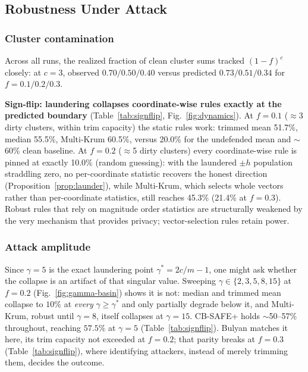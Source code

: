\documentclass[lettersize,journal]{IEEEtran}
\begin{document}


\subsection{Robustness Under Attack}
\subsubsection{Cluster contamination} Across all runs, the realized fraction of
clean cluster sums tracked $(1-f)^c$ closely: at $c{=}3$, observed $0.70/0.50/0.40$
versus predicted $0.73/0.51/0.34$ for $f{=}0.1/0.2/0.3$.

\textbf{Sign-flip: laundering collapses coordinate-wise rules exactly at the
predicted boundary} (Table~\ref{tab:signflip}, Fig.~\ref{fig:dynamics}). At $f{=}0.1$ ($\approx$3 dirty
clusters, within trim capacity) the static rules work: trimmed mean 51.7\%, median
55.5\%, Multi-Krum 60.5\%, versus 20.0\% for the undefended mean and $\sim$60\% clean
baseline. At $f{=}0.2$ ($\approx$5 dirty clusters) every coordinate-wise rule is
pinned at exactly 10.0\% (random guessing): with the laundered $\pm h$ population
straddling zero, no per-coordinate statistic recovers the honest direction
(Proposition~\ref{prop:launder}), while Multi-Krum, which selects whole vectors
rather than per-coordinate statistics, still reaches 45.3\% (21.4\% at $f{=}0.3$).
Robust rules that rely on magnitude order statistics are structurally weakened by
the very mechanism that provides privacy; vector-selection rules retain power.

\subsubsection{Attack amplitude} Since $\gamma{=}5$ is the
exact laundering point $\gamma^{*}{=}2c/m{-}1$, one might ask whether the collapse is
an artifact of that singular value. Sweeping $\gamma\in\{2,3,5,8,15\}$ at $f{=}0.2$
(Fig.~\ref{fig:gamma-basin}) shows it is not: median and trimmed mean collapse to
$10\%$ at \emph{every} $\gamma\ge\gamma^{*}$ and only partially degrade below it, and
Multi-Krum, robust until $\gamma{=}8$, itself collapses at $\gamma{=}15$. CB-SAFE+
holds $\sim$50--57\% throughout, reaching $57.5\%$ at $\gamma{=}5$ (Table~\ref{tab:signflip}). Bulyan matches it here, its trim capacity not
exceeded at $f{=}0.2$; that parity breaks at $f{=}0.3$ (Table~\ref{tab:signflip}),
where identifying attackers, instead of merely trimming them, decides the outcome.
\end{document}

